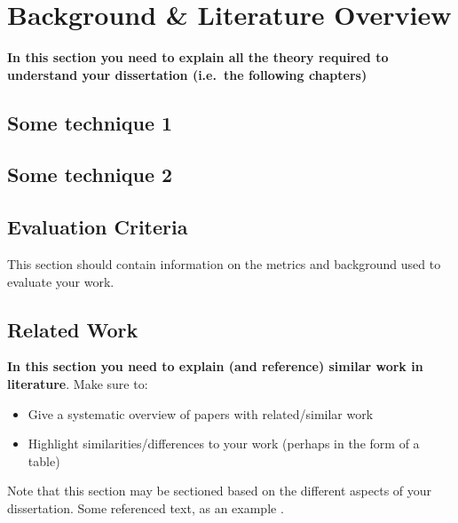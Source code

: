 \chapter{Background \& Literature Overview}
\textbf{In this section you need to explain all the theory required to understand your dissertation (i.e.\ the following chapters)}
\section{Some technique 1}
\blindtext
\section{Some technique 2}
\blindtext
\section{Evaluation Criteria}
This section should contain information on the metrics and background used to evaluate your work.
\section{Related Work}
\textbf{In this section you need to explain (and reference) similar work in literature}.  Make sure to:

\begin{itemize}
 \item Give a systematic overview of papers with related/similar work
 \item Highlight similarities/differences to your work (perhaps in the form of a table)
\end{itemize}

Note that this section may be sectioned based on the different aspects of your dissertation.  Some referenced text, as an example \citep{WithersMartinez2012, Ebejer2016}.

